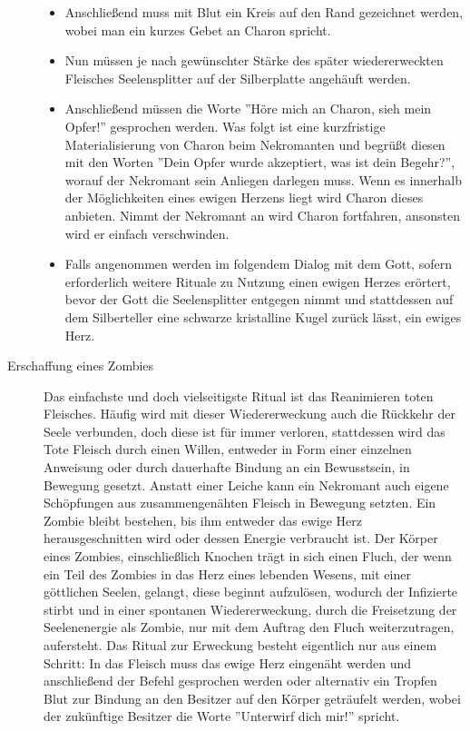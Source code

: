 \documentclass[a4paper,12pt,oneside]{book}
\begin{document}
\begin{description}
\begin{itemize}
\item Anschließend muss mit Blut ein Kreis auf den Rand gezeichnet werden, wobei man ein kurzes Gebet an Charon spricht.
\item Nun müssen je nach gewünschter Stärke des später wiedererweckten Fleisches  Seelensplitter auf der Silberplatte angehäuft werden.
\item Anschließend müssen die Worte ''Höre mich an Charon, sieh mein Opfer!'' gesprochen werden. Was folgt ist eine kurzfristige Materialisierung von Charon beim Nekromanten und begrüßt diesen mit den Worten ''Dein Opfer wurde akzeptiert, was ist dein Begehr?'', worauf der Nekromant sein Anliegen darlegen muss. Wenn es innerhalb der Möglichkeiten eines ewigen Herzens liegt wird Charon dieses anbieten. Nimmt der Nekromant an wird Charon fortfahren, ansonsten wird er einfach verschwinden.
\item Falls angenommen werden im folgendem Dialog mit dem Gott, sofern erforderlich weitere Rituale zu Nutzung einen ewigen Herzes erörtert, bevor der Gott die Seelensplitter entgegen nimmt und stattdessen auf dem Silberteller eine schwarze kristalline Kugel zurück lässt, ein ewiges Herz.
\end{itemize}
\item[Erschaffung eines Zombies] Das einfachste und doch vielseitigste Ritual ist das Reanimieren toten Fleisches. Häufig wird mit dieser Wiedererweckung auch die Rückkehr der Seele verbunden, doch diese ist für immer verloren, stattdessen wird das Tote Fleisch durch einen Willen, entweder in Form einer einzelnen Anweisung oder durch dauerhafte Bindung an ein Bewusstsein, in Bewegung gesetzt. Anstatt einer Leiche kann ein Nekromant auch eigene Schöpfungen aus zusammengenähten Fleisch in Bewegung setzten. Ein Zombie bleibt bestehen, bis ihm entweder das ewige Herz herausgeschnitten wird oder dessen Energie verbraucht ist. Der Körper eines Zombies, einschließlich Knochen trägt in sich einen Fluch, der wenn ein Teil des Zombies in das Herz eines lebenden Wesens, mit einer göttlichen Seelen, gelangt, diese beginnt aufzulösen, wodurch der Infizierte stirbt und in einer spontanen Wiedererweckung, durch die Freisetzung der Seelenenergie als Zombie, nur mit dem Auftrag den Fluch weiterzutragen, aufersteht. Das Ritual zur Erweckung besteht eigentlich nur aus einem Schritt: In das Fleisch muss das ewige Herz eingenäht werden und anschließend der Befehl gesprochen werden oder alternativ ein Tropfen Blut zur Bindung an den Besitzer auf den Körper geträufelt werden, wobei der zukünftige Besitzer die Worte ''Unterwirf dich mir!'' spricht.

\end{description}
\end{document}
